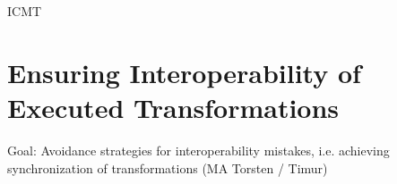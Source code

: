 \begin{copiedFrom}{ICMT}


\end{copiedFrom} %


\section{Ensuring Interoperability of Executed Transformations 
}
Goal: Avoidance strategies for interoperability mistakes, i.e. achieving synchronization of transformations (MA Torsten / Timur)
\label{chap:prevention:interoperability}

